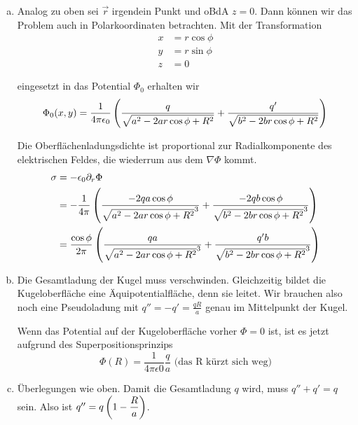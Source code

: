 \documentclass[a4paper,german,12pt,smallheadings]{scrartcl}
\begin{document}
\begin{enumerate}[a)]
\item
  Analog zu oben sei $\vec{r}$ irgendein Punkt und oBdA $z=0$. Dann können wir
  das Problem auch in Polarkoordinaten betrachten. Mit der Transformation
  \begin{align*}
    x &= r \cos \phi \\
    y &= r \sin \phi \\
    z &= 0
  \end{align*}

  eingesetzt in das Potential $\Phi_0$ erhalten wir
  \begin{equation}
    \Phi_0(x,y) = \frac{1}{4 \pi \epsilon_0} \del{
      \frac{q}{\sqrt{a^2 - 2 a r \cos \phi + R^2}} +
      \frac{q'}{\sqrt{b^2 - 2 b r \cos \phi + R^2}}
    }
  \end{equation}

  Die Oberflächenladungsdichte ist proportional zur Radialkomponente des
  elektrischen Feldes, die wiederrum aus dem $\nabla \Phi$ kommt.
  \begin{align}
    \sigma &= - \epsilon_0 \partial_r \Phi \\
           &= - \frac{1}{4 \pi} \del {
             \frac{-2qa \cos \phi}{\sqrt{a^2 - 2ar \cos \phi + R^2}^3} +
             \frac{-2qb \cos \phi}{\sqrt{b^2 - 2br \cos \phi + R^2}^3}
           } \\
           &= \frac{\cos \phi}{2 \pi} \del {
             \frac{qa}{\sqrt{a^2 - 2ar \cos \phi + R^2}^3} +
             \frac{q'b}{\sqrt{b^2 - 2br \cos \phi + R^2}^3}
           }
  \end{align}

\item
  Die Gesamtladung der Kugel muss verschwinden. Gleichzeitig bildet die
  Kugeloberfläche eine Äquipotentialfläche, denn sie leitet. Wir brauchen also
  noch eine Pseudoladung mit $q'' = -q' = \frac{qR}{a}$ genau im Mittelpunkt
  der Kugel.

  Wenn das Potential auf der Kugeloberfläche vorher $\Phi = 0$ ist, ist es
  jetzt aufgrund des Superpositionsprinzips
  \begin{equation}
    \Phi(R) = \frac{1}{4 \pi \epsilon 0} \frac{q}{a} \text{ (das R kürzt sich weg)}
  \end{equation}

\item Überlegungen wie oben. Damit die Gesamtladung $q$ wird, muss $q'' + q' =
  q$ sein. Also ist $q'' = q \del{1 - \dfrac{R}{a}}$.


\end{enumerate}
\end{document}
